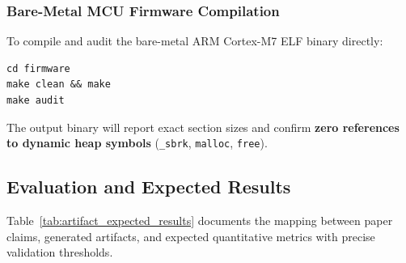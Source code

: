 \documentclass{article}
\begin{document}
\subsubsection{Bare-Metal MCU Firmware Compilation}
To compile and audit the bare-metal ARM Cortex-M7 ELF binary directly:
\begin{verbatim}
cd firmware
make clean && make
make audit
\end{verbatim}
The output binary  will report exact section sizes and confirm \textbf{zero references to dynamic heap symbols} (\texttt{\_sbrk}, \texttt{malloc}, \texttt{free}).

\subsection{Evaluation and Expected Results}
Table~\ref{tab:artifact_expected_results} documents the mapping between paper claims, generated artifacts, and expected quantitative metrics with precise validation thresholds.
\end{document}
